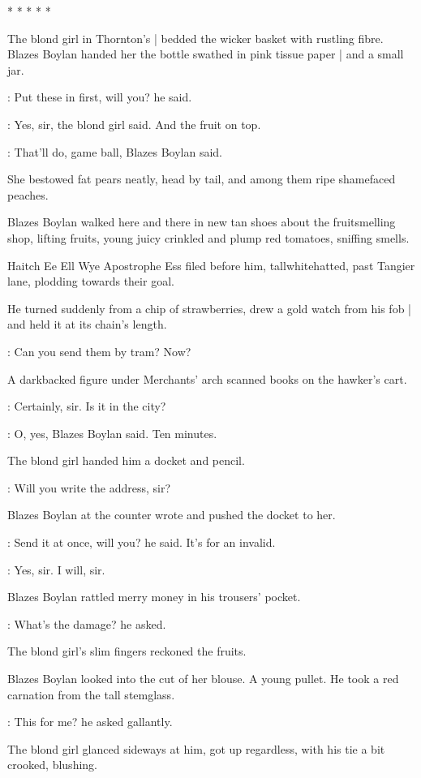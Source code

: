     * * * * *


The blond girl in Thornton's |
bedded the wicker basket with rustling fibre.
Blazes Boylan handed her the bottle swathed in pink tissue paper |
and a small jar.

\boylan:
Put these in first, will you?
he said.

\blondgirl:
Yes, sir,
the blond girl said.
And the fruit on top.

\boylan:
That'll do, game ball,
Blazes Boylan said.

She bestowed fat pears neatly,
head by tail,
and among them ripe shamefaced peaches.

Blazes Boylan walked here and there in new tan shoes
about the fruitsmelling shop,
lifting fruits,
young juicy crinkled and plump red tomatoes,
sniffing smells.

Haitch Ee Ell Wye Apostrophe Ess \stage{[H.E.L.Y.'S]}
filed before him, tallwhitehatted,
past Tangier lane,
plodding towards their goal.

He turned suddenly from a chip of strawberries,
drew a gold watch from his fob |
and held it at its chain's length.

\boylan:
Can you send them by tram? Now?

A darkbacked figure under Merchants' arch
scanned books on the hawker's cart.

\blondgirl:
Certainly, sir. Is it in the city?

\boylan:
O, yes,
Blazes Boylan said.
Ten minutes.

The blond girl handed him a docket and pencil.

\blondgirl:
Will you write the address,
sir?

Blazes Boylan at the counter wrote and pushed the docket to her.

\boylan:
Send it at once, will you?
he said.
It's for an invalid.

\blondgirl:
Yes, sir. I will, sir.

Blazes Boylan rattled merry money in his trousers' pocket.

\boylan:
What's the damage?
he asked.

The blond girl's slim fingers reckoned the fruits.

Blazes Boylan looked into the cut of her blouse.
A young pullet.
He took a red carnation from the tall stemglass.

\boylan:
This for me?
he asked gallantly.

The blond girl glanced sideways at him,
got up regardless,
with his tie a bit crooked,
blushing.

